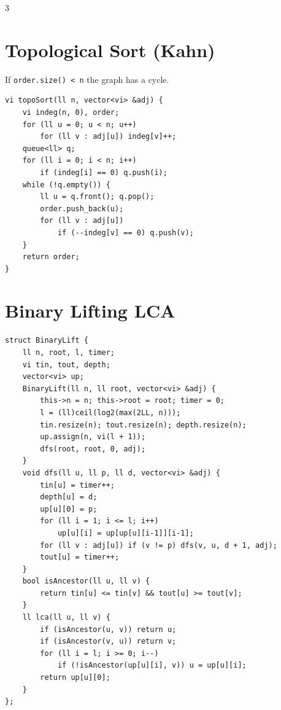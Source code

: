 \documentclass[10pt]{article}
\newcommand{\csection}[1]{\section{\textcolor{addc}{#1}}}
\newcommand{\cnote}[1]{{\scriptsize\color{addc} #1}\par}
\begin{document}
\begin{multicols*}{3}
\csection{Topological Sort (Kahn)}
\cnote{If \texttt{order.size() < n} the graph has a cycle.}
\begin{lstlisting}[style=cppnew]
vi topoSort(ll n, vector<vi> &adj) {
    vi indeg(n, 0), order;
    for (ll u = 0; u < n; u++)
        for (ll v : adj[u]) indeg[v]++;
    queue<ll> q;
    for (ll i = 0; i < n; i++)
        if (indeg[i] == 0) q.push(i);
    while (!q.empty()) {
        ll u = q.front(); q.pop();
        order.push_back(u);
        for (ll v : adj[u])
            if (--indeg[v] == 0) q.push(v);
    }
    return order;
}
\end{lstlisting}

\section{Binary Lifting LCA}
\begin{lstlisting}
struct BinaryLift {
    ll n, root, l, timer;
    vi tin, tout, depth;
    vector<vi> up;
    BinaryLift(ll n, ll root, vector<vi> &adj) {
        this->n = n; this->root = root; timer = 0;
        l = (ll)ceil(log2(max(2LL, n)));
        tin.resize(n); tout.resize(n); depth.resize(n);
        up.assign(n, vi(l + 1));
        dfs(root, root, 0, adj);
    }
    void dfs(ll u, ll p, ll d, vector<vi> &adj) {
        tin[u] = timer++;
        depth[u] = d;
        up[u][0] = p;
        for (ll i = 1; i <= l; i++)
            up[u][i] = up[up[u][i-1]][i-1];
        for (ll v : adj[u]) if (v != p) dfs(v, u, d + 1, adj);
        tout[u] = timer++;
    }
    bool isAncestor(ll u, ll v) {
        return tin[u] <= tin[v] && tout[u] >= tout[v];
    }
    ll lca(ll u, ll v) {
        if (isAncestor(u, v)) return u;
        if (isAncestor(v, u)) return v;
        for (ll i = l; i >= 0; i--)
            if (!isAncestor(up[u][i], v)) u = up[u][i];
        return up[u][0];
    }
};
\end{lstlisting}


\end{multicols*}
\end{document}

